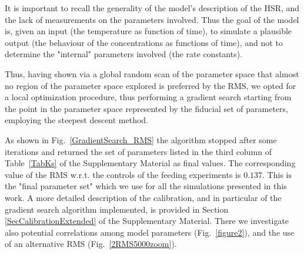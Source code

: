 \documentclass[oneside, 10pt, a4paper, twocolumn]{article}
\begin{document}
It is important to recall the generality of the model's description of the HSR, and the lack of measurements on the parameters involved. Thus the goal of the model is, given an input (the temperature as function of time), to simulate a plausible output (the behaviour of the concentrations as functions of time), and not to determine the "internal" parameters involved (the rate constants). 


Thus, having shown via a global random scan of the parameter space that almost no region of the parameter space explored is preferred by the RMS, we opted for a local optimization procedure, thus performing a gradient search starting from the point in the parameter space represented by the fiducial set of parameters, 
employing the steepest descent method. 

As shown in Fig.~\ref{GradientSearch_RMS} the algorithm stopped after some iterations and returned the set of parameters listed in the third column of Table~\ref{TabKs} of the Supplementary Material as final values. The corresponding value of the RMS w.r.t. the controls of the feeding experiments is $0.137$. 
This is the "final parameter set" which we use for all the simulations
presented in this work. %
A more detailed description of the calibration, and in particular of the gradient search algorithm implemented, is provided in Section \ref{SecCalibrationExtended} of the Supplementary Material. There we investigate also potential correlations among model parameters (Fig.~\ref{figure2}), and the use of an alternative RMS (Fig.~\ref{2RMS5000zoom}).



\end{document}
